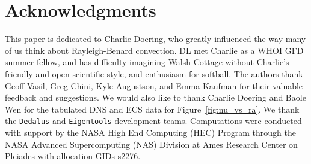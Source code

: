 \documentclass[reprint,amsmath,amssymb,aps,nofootinbib]{revtex4-1}
\newcommand\Ra{\mathrm{Ra}}
\newcommand\Nu{\mathrm{Nu}}
\newcommand{\eq}[1]{(\ref{#1})}
\begin{document}

\section*{Acknowledgments}
This paper is dedicated to Charlie Doering, who greatly influenced the way many of us think about Rayleigh-Benard convection.
DL met Charlie as a WHOI GFD summer fellow, and has difficulty imagining Walsh Cottage without Charlie's friendly and open scientific style, and enthusiasm for softball.
The authors thank Geoff Vasil, Greg Chini, Kyle Augustson, and Emma Kaufman for their valuable feedback and suggestions.
We would also like to thank Charlie Doering and Baole Wen for the tabulated DNS and ECS data for Figure~\ref{fig:nu_vs_ra}.
We thank the \texttt{Dedalus} and \texttt{Eigentools} development teams. 
Computations were conducted with support by the NASA High End Computing (HEC) Program through the NASA Advanced Supercomputing (NAS) Division at Ames Research Center on Pleiades with allocation GIDs s2276.

\appendix
\end{document}
